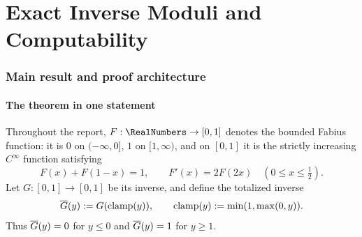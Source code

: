
\part{Exact Inverse Moduli and Computability}


\section{Main result and proof architecture}

\subsection{The theorem in one statement}

Throughout the report, $F:\RealNumbers\to[0,1]$ denotes the bounded Fabius function:
it is $0$ on $(-\infty,0]$, $1$ on $[1,\infty)$, and on $[0,1]$ it is the
strictly increasing $C^\infty$ function satisfying
\begin{equation}\label{co:eq:F-basic}
 F(x)+F(1-x)=1,
 \qquad
 F'(x)=2F(2x)\quad(0\le x\le\tfrac12).
\end{equation}
Let $G:[0,1]\to[0,1]$ be its inverse, and define the totalized inverse
\begin{equation}\label{co:eq:totalized-inverse}
 \overline G(y):=G(\operatorname{clamp}(y)),
 \qquad
 \operatorname{clamp}(y):=\min(1,\max(0,y)).
\end{equation}
Thus $\overline G(y)=0$ for $y\le0$ and $\overline G(y)=1$ for $y\ge1$.

